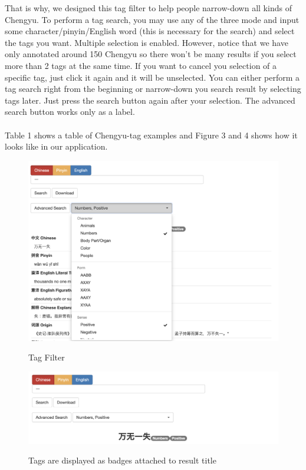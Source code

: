 \documentclass[11pt]{article} %
\begin{document}
That is why, we designed this tag filter to help people narrow-down all kinds of Chengyu. To perform a tag search, you may use any of the three mode and input some character/pinyin/English word (this is necessary for the search) and select the tags you want. Multiple selection is enabled. However, notice that we have only annotated around 150 Chengyu so there won't be many results if you select more than 2 tags at the same time. If you want to cancel you selection of a specific tag, just click it again and it will be unselected. You can either perform a tag search right from the beginning or narrow-down you search result by selecting tags later. Just press the search button again after your selection. The advanced search button works only as a label. \\
\\
Table 1 shows a table of Chengyu-tag examples and Figure 3 and 4 shows how it looks like in our application. 

\begin{table}[h]
\caption{Chengyu-Tags Examples}
\end{table}

\begin{figure}[htbp]
\begin{center}
\includegraphics[width=14cm]{filter.png}
\caption{Tag Filter}
\label{default}
\includegraphics[width=14cm]{badge1.png}
\caption{Tags are displayed as badges attached to result title}
\label{default}
\end{center}
\end{figure}
\end{document}
